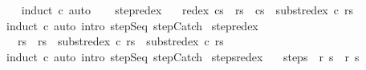 \begin{isabellebody}
%
\isadelimproof
\ \ %
\endisadelimproof
%
\isatagproof
{}\isamarkupfalse%
\ {\isacharparenleft}induct\ c{\isacharparenright}\ auto%
\endisatagproof
{\isafoldproof}%
%
\isadelimproof
\isanewline
%
\endisadelimproof
\ \ \isanewline
{}\isamarkupfalse%
\ step{\isacharunderscore}redex{\isacharprime}{\isacharcolon}\isanewline
\ \ \ {\isachardoublequoteopen}{\isasymGamma}{\isasymturnstile}{\isacharparenleft}redex\ c{\isacharcomma}s{\isacharparenright}\ {\isasymrightarrow}\ {\isacharparenleft}r{\isacharprime}{\isacharcomma}s{\isacharprime}{\isacharparenright}\ {\isasymLongrightarrow}\ {\isasymGamma}{\isasymturnstile}{\isacharparenleft}c{\isacharcomma}s{\isacharparenright}\ {\isasymrightarrow}\ {\isacharparenleft}subst{\isacharunderscore}redex\ c\ r{\isacharprime}{\isacharcomma}s{\isacharprime}{\isacharparenright}{\isachardoublequoteclose}\isanewline
%
\isadelimproof
%
\endisadelimproof
%
\isatagproof
{}\isamarkupfalse%
\ {\isacharparenleft}induct\ c{\isacharparenright}\ {\isacharparenleft}auto\ intro{\isacharcolon}\ step{\isachardot}Seq\ step{\isachardot}Catch{\isacharparenright}%
\endisatagproof
{\isafoldproof}%
%
\isadelimproof
\isanewline
%
\endisadelimproof
\isanewline
\isanewline
{}\isamarkupfalse%
\ step{\isacharunderscore}redex{\isacharcolon}\isanewline
\ \ \ {\isachardoublequoteopen}{\isasymGamma}{\isasymturnstile}{\isacharparenleft}r{\isacharcomma}s{\isacharparenright}\ {\isasymrightarrow}\ {\isacharparenleft}r{\isacharprime}{\isacharcomma}s{\isacharprime}{\isacharparenright}\ {\isasymLongrightarrow}\ {\isasymGamma}{\isasymturnstile}{\isacharparenleft}subst{\isacharunderscore}redex\ c\ r{\isacharcomma}s{\isacharparenright}\ {\isasymrightarrow}\ {\isacharparenleft}subst{\isacharunderscore}redex\ c\ r{\isacharprime}{\isacharcomma}s{\isacharprime}{\isacharparenright}{\isachardoublequoteclose}\isanewline
%
\isadelimproof
%
\endisadelimproof
%
\isatagproof
{}\isamarkupfalse%
\ {\isacharparenleft}induct\ c{\isacharparenright}\ {\isacharparenleft}auto\ intro{\isacharcolon}\ step{\isachardot}Seq\ step{\isachardot}Catch{\isacharparenright}%
\endisatagproof
{\isafoldproof}%
%
\isadelimproof
\isanewline
%
\endisadelimproof
\isanewline
{}\isamarkupfalse%
\ steps{\isacharunderscore}redex{\isacharcolon}\isanewline
\ \ \ steps{\isacharcolon}\ {\isachardoublequoteopen}{\isasymGamma}{\isasymturnstile}\ {\isacharparenleft}r{\isacharcomma}\ s{\isacharparenright}\ {\isasymrightarrow}\isactrlsup {\isacharasterisk}\ {\isacharparenleft}r{\isacharprime}{\isacharcomma}\ s{\isacharprime}{\isacharparenright}{\isachardoublequoteclose}\isanewline

\end{isabellebody}
